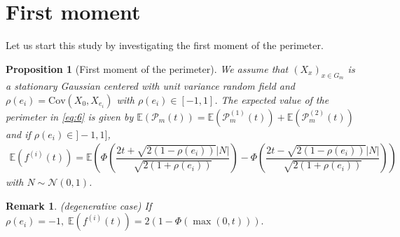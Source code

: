 \documentclass[12pt]{article}
\theoremstyle{Theorem}
\newtheorem{Proposition}[Theorem]{Proposition}
\newtheorem{remark}{Remark}
\begin{document}
\section{First moment}
Let us start this study by investigating the first moment of the perimeter.
\begin{Proposition}[First moment of the perimeter] 
\label{propFisrtmoment}
We assume that $\left(X_x \right)_{x \in G_{m}}$ is a stationary Gaussian centered with unit variance random field and $\rho(e_i) = \text{Cov}\left(X_{\scriptscriptstyle 0}, X_{e_i}\right)$ with $\rho(e_i) \in [-1, 1]$. The expected value of the perimeter in \eqref{eq:6} is  given \linebreak by $\mathbb{E}\left(\mathcal{P}_{m}(t)\right) = \mathbb{E}\left(\mathcal{P}^{\scriptscriptstyle  (1)}_{m}(t)\right) + \mathbb{E}\left(\mathcal{P}^{\scriptscriptstyle  (2)}_{m}(t)\right)$  and
if $\rho(e_{i}) \in ]-1,1]$, 
{\small
\begin{align}
\label{propEquationFisrtmoment}
\mathbb{E}\left(f^{(i)}(t) \right) = \mathbb{E}\left(\Phi\left(\dfrac{2t + \sqrt{2(1-\rho(e_i))}|N|}{\sqrt{2(1+\rho(e_i))}}\right)  - \Phi\left(\dfrac{2t - \sqrt{2(1-\rho(e_i))}|N|}{\sqrt{2(1+\rho(e_i))}}\right)\right)
\end{align}}
with $N \sim \mathcal{N}(0,1)$. 
\end{Proposition}
\begin{remark}(degenerative case)
If  $\rho(e_i) = -1, \; \mathbb{E}\left(f^{(i)}(t) \right)= 2\left(1 - \Phi\left(\max\left(0,t\right)\right)\right).$
\end{remark}
\end{document}
